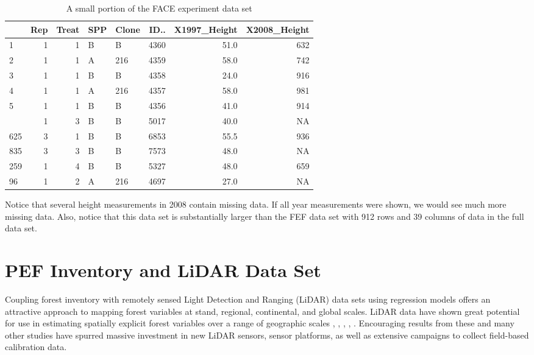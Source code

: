 \documentclass[]{krantz}
\theoremstyle{definition}
\theoremstyle{definition}
\theoremstyle{definition}
\theoremstyle{remark}
\begin{document}
\begin{table}

\caption{\label{tab:face}A small portion of the FACE experiment data set}
\centering
\begin{tabular}[t]{lrrllrrr}
\toprule
  & Rep & Treat & SPP & Clone & ID.. & X1997\_Height & X2008\_Height\\
\midrule
1 & 1 & 1 & B & B & 4360 & 51.0 & 632\\
2 & 1 & 1 & A & 216 & 4359 & 58.0 & 742\\
3 & 1 & 1 & B & B & 4358 & 24.0 & 916\\
4 & 1 & 1 & A & 216 & 4357 & 58.0 & 981\\
5 & 1 & 1 & B & B & 4356 & 41.0 & 914\\
\addlinespace
183 & 1 & 3 & B & B & 5017 & 40.0 & NA\\
625 & 3 & 1 & B & B & 6853 & 55.5 & 936\\
835 & 3 & 3 & B & B & 7573 & 48.0 & NA\\
259 & 1 & 4 & B & B & 5327 & 48.0 & 659\\
96 & 1 & 2 & A & 216 & 4697 & 27.0 & NA\\
\bottomrule
\end{tabular}
\end{table}

Notice that several height measurements in 2008 contain missing data. If
all year measurements were shown, we would see much more missing data.
Also, notice that this data set is substantially larger than the FEF
data set with 912 rows and 39 columns of data in the full data set.

\section{PEF Inventory and LiDAR Data Set}\label{pef}

Coupling forest inventory with remotely sensed Light Detection and
Ranging (LiDAR) data sets using regression models offers an attractive
approach to mapping forest variables at stand, regional, continental,
and global scales. LiDAR data have shown great potential for use in
estimating spatially explicit forest variables over a range of
geographic scales \citep{asner2009}, \citep{babcock2013},
\citep{finley2011}, \citep{naesset2011}, \citep{neigh2013}. Encouraging
results from these and many other studies have spurred massive
investment in new LiDAR sensors, sensor platforms, as well as extensive
campaigns to collect field-based calibration data.
\end{document}
